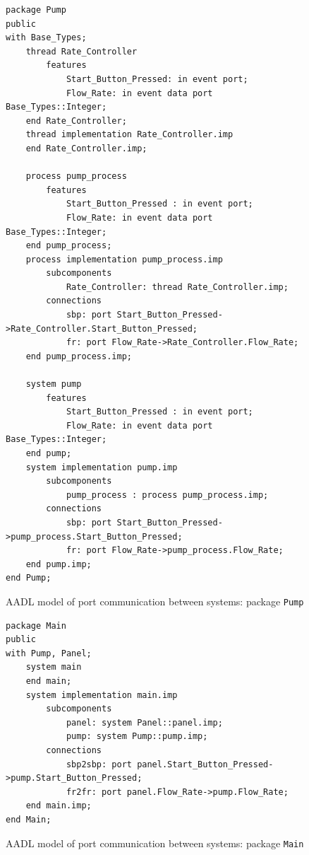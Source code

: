 \begin{figure}%
\singlespacing
\begin{lstlisting}[language=aadl, frame=single, gobble=0]
package Pump
public
with Base_Types;
	thread Rate_Controller
		features 
			Start_Button_Pressed: in event port;
			Flow_Rate: in event data port Base_Types::Integer;
	end Rate_Controller;	
	thread implementation Rate_Controller.imp
	end Rate_Controller.imp;
	
	process pump_process
		features
			Start_Button_Pressed : in event port;
			Flow_Rate: in event data port Base_Types::Integer;
	end pump_process;	
	process implementation pump_process.imp
		subcomponents
			Rate_Controller: thread Rate_Controller.imp;
		connections		
			sbp: port Start_Button_Pressed->Rate_Controller.Start_Button_Pressed;
			fr: port Flow_Rate->Rate_Controller.Flow_Rate;
	end pump_process.imp;
	
	system pump
		features
			Start_Button_Pressed : in event port;
			Flow_Rate: in event data port Base_Types::Integer;
	end pump;	
	system implementation pump.imp
		subcomponents
			pump_process : process pump_process.imp;
		connections
			sbp: port Start_Button_Pressed->pump_process.Start_Button_Pressed;
			fr: port Flow_Rate->pump_process.Flow_Rate;
	end pump.imp;
end Pump;
\end{lstlisting} 
\doublespacing
\caption{AADL model of port communication between systems: package \lstinline{Pump}}
\label{listing:port_communication_pump}
\end{figure}

\begin{figure}%
\singlespacing
\begin{lstlisting}[language=aadl, frame=single, gobble=0]
package Main
public
with Pump, Panel;
	system main	
	end main;	
	system implementation main.imp
		subcomponents
			panel: system Panel::panel.imp;
			pump: system Pump::pump.imp;
		connections
			sbp2sbp: port panel.Start_Button_Pressed->pump.Start_Button_Pressed;
			fr2fr: port panel.Flow_Rate->pump.Flow_Rate;
	end main.imp;
end Main;
\end{lstlisting} 
\doublespacing
\caption{AADL model of port communication between systems: package \lstinline{Main}}
\label{listing:port_communication_main}
\end{figure}

\clearpage

